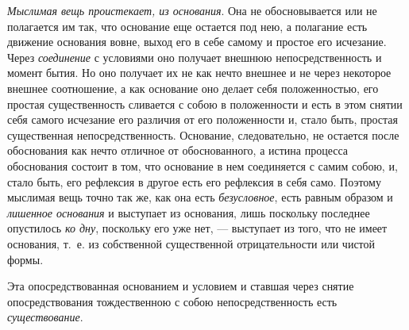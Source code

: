 {\em Мыслимая вещь проистекает, из основания}. Она не
обосновывается или не полагается им так, что основание еще остается под
нею, а полагание есть движение основания вовне, выход его в себе самому и
простое его исчезание. Через {\em соединение} с
условиями оно получает внешнюю непосредственность и момент бытия. Но оно
получает их не как нечто внешнее и не через некоторое внешнее соотношение,
а как основание оно делает себя положенностью, его простая существенность
сливается с собою в положенности и есть в этом снятии себя самого исчезание
его различия от его положенности и, стало быть, простая существенная
непосредственность. Основание, следовательно, не остается после обоснования
как нечто отличное от обоснованного, а истина процесса обоснования состоит
в том, что основание в нем соединяется с самим собою, и, стало быть, его
рефлексия в другое есть его рефлексия в себя само. Поэтому мыслимая вещь
точно так же, как она есть {\em безусловное}, есть
равным образом и {\em лишенное основания} и выступает
из основания, лишь поскольку последнее опустилось
{\em ко дну}, поскольку его уже нет, — выступает из
того, что не имеет основания, т.~е. из собственной существенной
отрицательности или чистой формы.

Эта опосредствованная основанием и условием и ставшая через снятие
опосредствования тождественною с собою непосредственность есть
{\em существование}.


\bigskip

